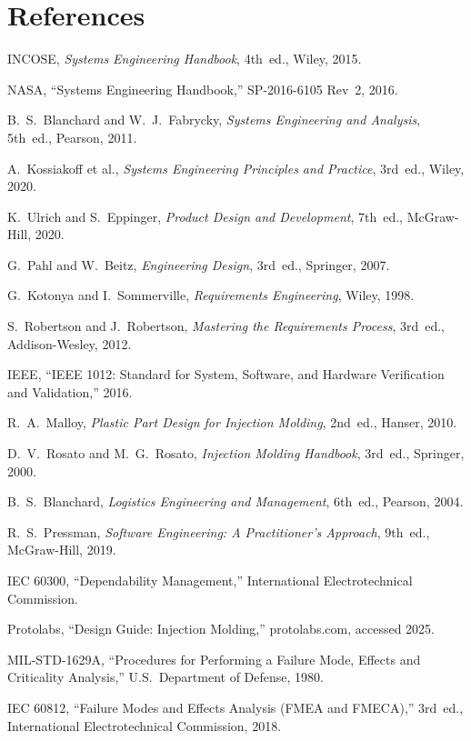 \documentclass[11pt,letterpaper,twoside,openany]{book}
\begin{document}
\FloatBarrier
\chapter*{References}

\begin{enumerate}[label={[\arabic*]},leftmargin=2em]
\item INCOSE, \emph{Systems Engineering Handbook}, 4th~ed., Wiley, 2015.
\item NASA, ``Systems Engineering Handbook,'' SP-2016-6105 Rev~2, 2016.
\item B.~S.~Blanchard and W.~J.~Fabrycky, \emph{Systems Engineering and Analysis}, 5th~ed., Pearson, 2011.
\item A.~Kossiakoff et al., \emph{Systems Engineering Principles and Practice}, 3rd~ed., Wiley, 2020.
\item K.~Ulrich and S.~Eppinger, \emph{Product Design and Development}, 7th~ed., McGraw-Hill, 2020.
\item G.~Pahl and W.~Beitz, \emph{Engineering Design}, 3rd~ed., Springer, 2007.
\item G.~Kotonya and I.~Sommerville, \emph{Requirements Engineering}, Wiley, 1998.
\item S.~Robertson and J.~Robertson, \emph{Mastering the Requirements Process}, 3rd~ed., Addison-Wesley, 2012.
\item IEEE, ``IEEE 1012: Standard for System, Software, and Hardware Verification and Validation,'' 2016.
\item R.~A.~Malloy, \emph{Plastic Part Design for Injection Molding}, 2nd~ed., Hanser, 2010.
\item D.~V.~Rosato and M.~G.~Rosato, \emph{Injection Molding Handbook}, 3rd~ed., Springer, 2000.
\item B.~S.~Blanchard, \emph{Logistics Engineering and Management}, 6th~ed., Pearson, 2004.
\item R.~S.~Pressman, \emph{Software Engineering: A Practitioner's Approach}, 9th~ed., McGraw-Hill, 2019.
\item IEC 60300, ``Dependability Management,'' International Electrotechnical Commission.
\item Protolabs, ``Design Guide: Injection Molding,'' protolabs.com, accessed 2025.
\item MIL-STD-1629A, ``Procedures for Performing a Failure Mode, Effects and Criticality Analysis,'' U.S.\ Department of Defense, 1980.
\item IEC 60812, ``Failure Modes and Effects Analysis (FMEA and FMECA),'' 3rd~ed., International Electrotechnical Commission, 2018.

\end{enumerate}
\end{document}
